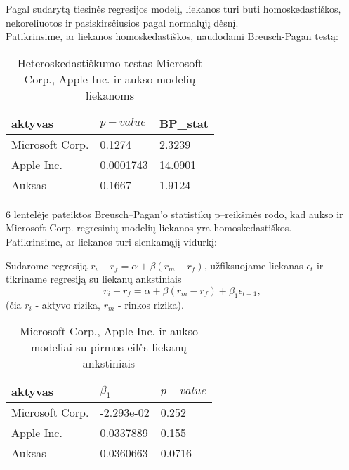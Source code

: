 \documentclass[12pt, a14paper, lithuanian]{article}
\begin{document}
Pagal sudarytą tiesinės regresijos modelį, liekanos turi buti homoskedastiškos, nekoreliuotos ir pasiskirsčiusios pagal normalųjį dėsnį. \\

Patikrinsime, ar liekanos homoskedastiškos, naudodami Breusch-Pagan testą:

\begin{table}[ht]
\begin{center}
    \begin{tabular}{ | l | l | l |}
    \hline
    aktyvas  & $ p-value $ & BP_{stat} \\
    \hline
  Microsoft Corp. & 0.1274 & 2.3239\\
	Apple Inc. & 0.0001743 & 14.0901\\
	Auksas &  0.1667 & 1.9124\\
	\hline
    \end{tabular}
\end{center}
\caption{Heteroskedastiškumo testas Microsoft Corp., Apple Inc. ir aukso modelių liekanoms}
\end{table}

6 lentelėje pateiktos Breusch--Pagan'o statistikų p--reikšmės rodo, kad aukso ir Microsoft Corp. regresinių modelių liekanos yra homoskedastiškos.\\

Patikrinsime, ar liekanos turi slenkamąjį vidurkį:

Sudarome regresiją $ r_i-r_f=\alpha + \beta  (r_m-r_f)  $,
užfiksuojame liekanas $\epsilon_t$ ir tikriname regresiją su liekanų ankstiniais  
$$ r_i-r_f=\alpha + \beta  (r_m-r_f) + \beta_1 \epsilon_{t-1},  $$
(čia $r_i$ - aktyvo rizika, $r_m$ - rinkos rizika).


\begin{table}[ht]
\begin{center}
    \begin{tabular}{ | l | l | l | }
    \hline
    aktyvas  &  $\beta_1$  & $ p-value $  \\
    \hline
	Microsoft Corp. & -2.293e-02 & 0.252\\
	Apple Inc. & 0.0337889 &  0.155\\
	Auksas & 0.0360663 &  0.0716\\
	\hline
    \end{tabular}
\end{center}
\caption{Microsoft Corp., Apple Inc. ir aukso modeliai su pirmos eilės liekanų ankstiniais}
\end{table}
\end{document}
